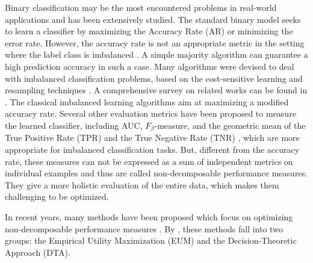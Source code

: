 \documentclass[15pt]{article}
\begin{document}
Binary classification may be the most encountered problems in real-world applications and has
been extensively studied.
The standard binary model seeks to learn a classifier by maximizing the Accuracy Rate (AR)
or minimizing the error rate. However, the accuracy rate is not an appropriate metric in the setting
where the label class is imbalanced \cite{Musicant2003,Dembczynsk2011,Menon2013,Parambath2014}.
A simple majority algorithm can guarantee a high prediction accuracy in such a case.
Many algorithms were devised to deal with imbalanced classification problems,
based on the cost-sensitive learning and resampling techniques \cite{Chawla2002,Khan2018,He2009,Kang2018,Kraw2020,Mathew2018}.
A comprehensive survey on related works can be found in \cite{He2009,Johnson2019,Guo2017}.
The classical imbalanced learning algorithms aim at maximizing a modified accuracy rate.
Several other evaluation metrics have been proposed to measure the learned classifier, including AUC,
$F_\beta$-measure, and the geometric mean of the True Positive Rate (TPR) and 
the True Negative Rate (TNR) \cite{Hu2018,Cano2013,Zhu2020}, 
which are more appropriate for imbalanced classification tasks.
But, different from the accuracy rate, these measures can not be expressed as a sum of independent
metrics on individual examples and thus are called non-decomposable performance measures.
They give a more holistic evaluation of the entire data, which makes them challenging to be optimized.

In recent years, many methods have been proposed which focus on optimizing non-decomposable performance
measures \cite{Bascol2019,Sanyal2018,Koyejo2014,Eban2017,Narasimhan2019}.
By \cite{Ye2012}, these methods fall into two groups: the Empirical Utility Maximization (EUM) and
the Decision-Theoretic Approach (DTA).
\end{document}
